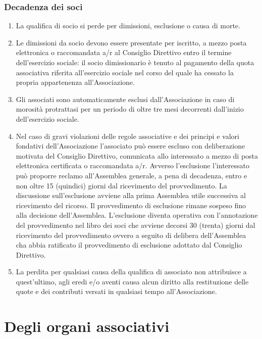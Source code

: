 \documentclass{djtsdoc}
\begin{document}
	\section{Decadenza dei soci}
	\begin{enumerate}
		\item La qualifica di socio si perde per dimissioni,  esclusione o causa di morte.
		\item Le dimissioni da socio devono essere presentate per iscritto, a mezzo posta elettronica o raccomandata a/r al Consiglio Direttivo entro il termine dell'esercizio sociale: il socio dimissionario è tenuto al pagamento della quota  associativa riferita all'esercizio  sociale nel corso del quale ha cessato la propria appartenenza all'Associazione.
		\item Gli associati sono automaticamente esclusi  dall'Associazione in caso di morosità protrattasi per un periodo di oltre tre mesi  decorrenti dall'inizio dell'esercizio sociale.
		\item Nel caso di gravi violazioni delle regole associative e dei principi e valori fondativi dell'Associazione l'associato può essere escluso con deliberazione motivata del Consiglio Direttivo, comunicata allo interessato a mezzo di posta elettronica certificata o raccomandata a/r. Avverso l'esclusione  l'interessato può proporre reclamo  all'Assemblea generale, a pena di decadenza, entro e non oltre 15 (quindici) giorni dal ricevimento del provvedimento. La discussione sull'esclusione avviene alla prima Assemblea utile successiva al ricevimento del ricorso. Il provvedimento di esclusione rimane sospeso fino alla decisione dell'Assemblea. L'esclusione diventa operativa con l'annotazione del provvedimento nel libro dei soci che avviene decorsi  30 (trenta) giorni dal ricevimento del provvedimento ovvero a seguito di delibera dell'Assemblea cha abbia ratificato il provvedimento di esclusione adottato dal Consiglio Direttivo.
		\item La perdita per qualsiasi causa della qualifica di associato non attribuisce a quest'ultimo, agli eredi e/o aventi causa alcun diritto alla restituzione delle quote e dei contributi versati in qualsiasi tempo all'Associazione.
	\end{enumerate}
	
	\part{Degli organi associativi}
\end{document}
